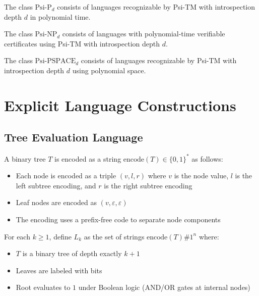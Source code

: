 \begin{definition}
The class $\text{Psi-P}_d$ consists of languages recognizable by Psi-TM with introspection depth $d$ in polynomial time.
\end{definition}

\begin{definition}
The class $\text{Psi-NP}_d$ consists of languages with polynomial-time verifiable certificates using Psi-TM with introspection depth $d$.
\end{definition}

\begin{definition}
The class $\text{Psi-PSPACE}_d$ consists of languages recognizable by Psi-TM with introspection depth $d$ using polynomial space.
\end{definition}

\section{Explicit Language Constructions}

\subsection{Tree Evaluation Language}

\begin{definition}
A binary tree $T$ is encoded as a string $\text{encode}(T) \in \{0,1\}^*$ as follows:
\begin{itemize}
\item Each node is encoded as a triple $(v, l, r)$ where $v$ is the node value, $l$ is the left subtree encoding, and $r$ is the right subtree encoding
\item Leaf nodes are encoded as $(v, \varepsilon, \varepsilon)$
\item The encoding uses a prefix-free code to separate node components
\end{itemize}
\end{definition}

\begin{definition}
For each $k \geq 1$, define $L_k$ as the set of strings $\text{encode}(T)\#1^n$ where:
\begin{itemize}
\item $T$ is a binary tree of depth exactly $k+1$
\item Leaves are labeled with bits  
\item Root evaluates to $1$ under Boolean logic (AND/OR gates at internal nodes)
\end{itemize}
\end{definition}

